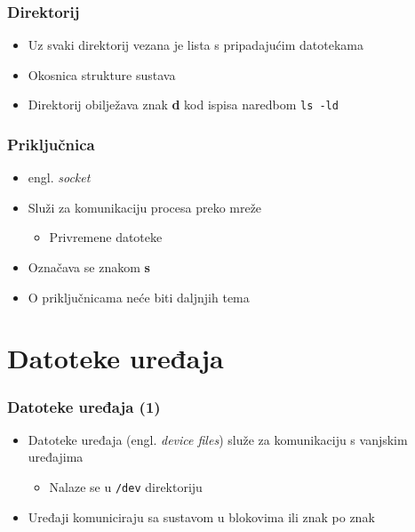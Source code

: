 \documentclass{beamer}
\newcommand{\shell}[1]{\texttt{\small #1}}
\begin{document}
\begin{frame}[t]
\frametitle{Direktorij}
\begin{itemize}
  \item Uz svaki direktorij vezana je lista s pripadajućim datotekama
  \item Okosnica strukture sustava
  \item Direktorij obilježava znak \textbf{d} kod ispisa naredbom
        \shell{ls -ld}
\end{itemize}
\end{frame}

\begin{frame}[t]
\frametitle{Priključnica}
\begin{itemize}
  \item engl. \emph{socket}
  \item Služi za komunikaciju procesa preko mreže
  \begin{itemize}
    \item Privremene datoteke
  \end{itemize}
  \item Označava se znakom \textbf{s}
  \item O priključnicama neće biti daljnjih tema
\end{itemize}
\end{frame}

\section{Datoteke uređaja}
\begin{frame}[t]
\frametitle{Datoteke uređaja (1)}
\begin{itemize}
  \item Datoteke uređaja (engl. \emph{device files}) služe za komunikaciju
        s vanjskim uređajima
  \begin{itemize}
    \item Nalaze se u \shell{/dev} direktoriju
  \end{itemize}
  \item Uređaji komuniciraju sa sustavom u blokovima ili znak po znak
\end{itemize}
\end{frame}
\end{document}
